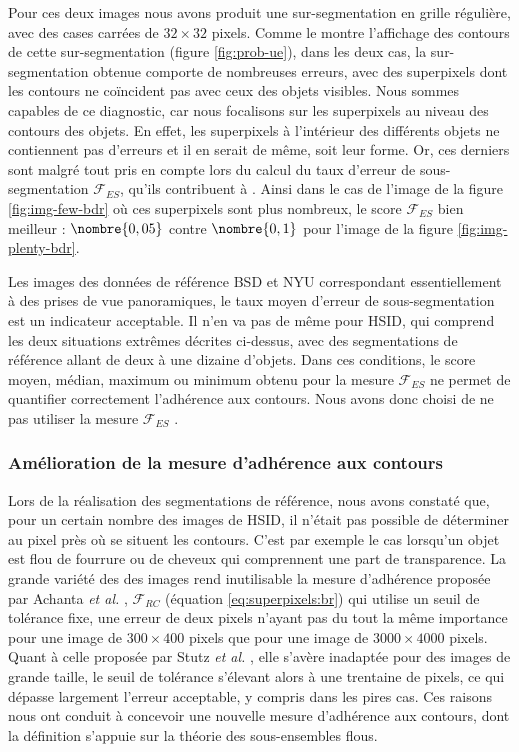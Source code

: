 Pour ces deux images\modif{,} nous avons produit une sur-segmentation en grille régulière, avec des cases carrées de $32\times32$ pixels. Comme le montre l'affichage des contours de cette sur-segmentation (figure \ref{fig:prob-ue}), dans les deux cas,  la sur-segmentation obtenue comporte de nombreuses erreurs, avec des superpixels dont les contours ne coïncident pas avec ceux des objets visibles. Nous sommes capables de ce diagnostic, car nous focalisons  sur les superpixels au niveau des contours des objets. En effet, les superpixels à l'intérieur des différents objets ne contiennent pas d'erreurs et il en serait de même,  soit leur forme. Or, ces derniers sont malgré tout pris en compte lors du calcul du taux d'erreur de sous-segmentation $\mathcal{F}_{ES}$, qu'ils contribuent à . Ainsi dans le cas de l'image de la figure \ref{fig:img-few-bdr} où ces superpixels sont plus nombreux, le score $\mathcal{F}_{ES}$ bien meilleur : $\nombre{0,05}$ contre $\nombre{0,1}$ pour l'image de la figure \ref{fig:img-plenty-bdr}.

Les images des données de référence BSD et NYU correspondant essentiellement à des prises de vue panoramiques, le taux moyen d'erreur de sous-segmentation est un indicateur acceptable. Il n'en va pas de même pour HSID, qui comprend les deux situations extrêmes décrites ci-dessus, avec des segmentations de référence allant de deux à une dizaine d'objets. Dans ces conditions, le score moyen, médian, maximum ou minimum obtenu pour la mesure  $\mathcal{F}_{ES}$  ne permet de quantifier correctement l'adhérence aux contours. Nous avons donc choisi de ne pas utiliser la mesure  $\mathcal{F}_{ES}$ .


\subsubsection{Amélioration de la mesure d'adhérence aux contours}

Lors de la réalisation des segmentations de référence, nous avons constaté que, pour un certain nombre des images de HSID, il n'était pas possible de déterminer au pixel près où se situent les contours. C'est par exemple le cas lorsqu'un objet est flou  de fourrure ou de cheveux qui comprennent une part de transparence. 
La grande variété des  des images  rend inutilisable la mesure d'adhérence proposée par Achanta \textit{et al.} \cite{achanta2012slic}, $\mathcal{F}_{RC}$ (équation \ref{eq:superpixels:br})\modif{,} qui utilise un seuil de tolérance fixe, une erreur de deux pixels n'ayant pas du tout la même importance pour une image de $300 \times 400$ pixels que pour une image de $3000 \times 4000$ pixels. Quant à celle proposée par Stutz \textit{et al.} \cite{stutz2015superpixel}, elle s'avère inadaptée pour des images de grande taille, le seuil de tolérance s'élevant alors à une trentaine de pixels, ce qui dépasse largement l'erreur acceptable, y compris dans les pires cas. Ces raisons nous ont conduit à concevoir une nouvelle mesure d'adhérence aux contours, dont la définition s'appuie sur la théorie des sous-ensembles flous. 

